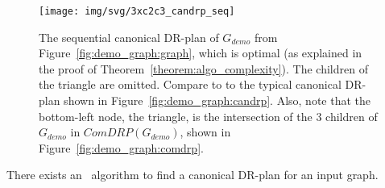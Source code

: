 \begin{figure}\centering%
  \texttt{[image: img/svg/3xc2c3\_candrp\_seq]}
  \caption{The sequential canonical DR-plan of $G_{demo}$ from Figure~\ref{fig:demo_graph:graph}, which is optimal (as explained in the proof of Theorem~\ref{theorem:algo_complexity}). The children of the triangle are omitted. Compare to to the typical canonical DR-plan shown in Figure~\ref{fig:demo_graph:candrp}. Also, note that the bottom-left node, the triangle, is the intersection of the 3 children of $G_{demo}$ in $ComDRP(G_{demo})$, shown in Figure~\ref{fig:demo_graph:comdrp}.}
  \label{fig:demo_graph:candrpseq}
\end{figure}%

\begin{theorem}\label{theorem:algo_complexity}
    There exists an \candrpcomplexityv\ algorithm to find a canonical DR-plan for an input graph.
\end{theorem}

